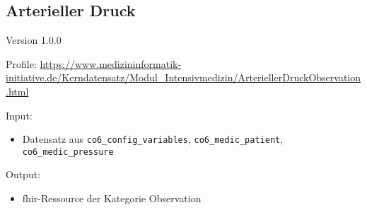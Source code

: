 \subsection{Arterieller Druck} 
\noindent Version 1.0.0

\noindent Profile: \url{https://www.medizininformatik-initiative.de/Kerndatensatz/Modul_Intensivmedizin/ArteriellerDruckObservation.html}

\noindent Input:
\begin{itemize}
	\item Datensatz aus \texttt{co6\_config\_variables}, \texttt{co6\_medic\_patient}, \\ \texttt{co6\_medic\_pressure}
\end{itemize}
Output:
\begin{itemize}
        \item \ac{fhir}-Ressource der Kategorie \glqq Observation\grqq{}
\end{itemize}
